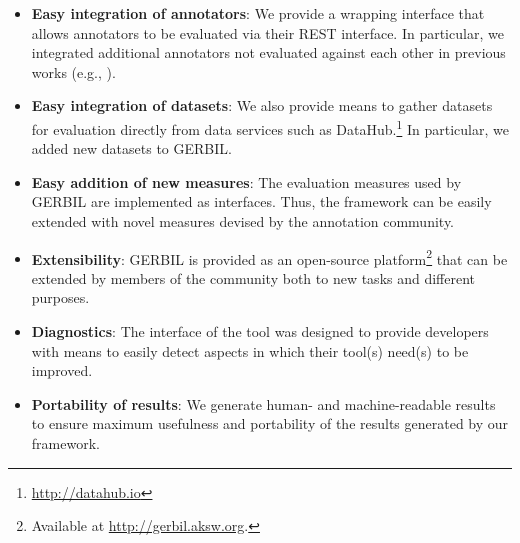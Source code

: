 \begin{itemize}
\item \textbf{Easy integration of annotators}: We provide a wrapping interface that allows annotators to be evaluated via their REST interface. In particular, we integrated \numberOfadditionalAnnotators additional annotators not evaluated against each other in previous works (e.g., \cite{cornolti}).  
\item \textbf{Easy integration of datasets}: We also provide means to gather datasets for evaluation directly from data services such as DataHub.\footnote{\url{http://datahub.io}} In particular, we added \numberOfadditionalDatasets new datasets to GERBIL.
\item \textbf{Easy addition of new measures}: The evaluation measures used by GERBIL are implemented as interfaces. Thus, the framework can be easily extended with novel measures devised by the annotation community.
\item \textbf{Extensibility}: GERBIL is provided as an open-source platform\footnote{Available at \url{http://gerbil.aksw.org}.} that can be extended by members of the community both to new tasks and different purposes.
\item \textbf{Diagnostics}: The interface of the tool was designed to provide developers with means to easily detect aspects in which their tool(s) need(s) to be improved. 
\item \textbf{Portability of results}: We generate human- and machine-readable results to ensure maximum usefulness and portability of the results generated by our framework. 
\end{itemize}


